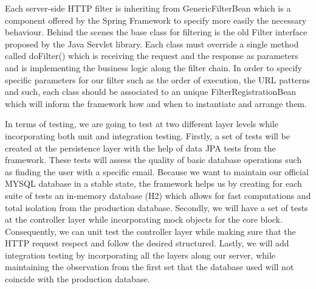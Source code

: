 Each server-side HTTP filter is inheriting from GenericFilterBean which is a component offered by the Spring Framework to specify more easily the necessary behaviour. Behind the scenes the base class for filtering is the old Filter interface proposed by the Java Servlet library. Each class must override a single method called doFilter() which is receiving the request and the response as parameters and is implementing the business logic along the filter chain. In order to specify specific parameters for our filter such as the order of execution, the URL patterns and such, each class should be associated to an unique FilterRegistrationBean which will inform the framework how and when to instantiate and arrange them.

In terms of testing, we are going to test at two different layer levels while incorporating both unit and integration testing. Firstly, a set of tests will be created at the persistence layer with the help of data JPA tests from the framework. These tests will assess the quality of basic database operations such as finding the user with a specific email. Because we want to maintain our official MYSQL database in a stable state, the framework helps us by creating for each suite of tests an in-memory database (H2) which allows for fast computations and total isolation from the production database. Secondly, we will have a set of tests at the controller layer while incorporating mock objects for the core block. Consequently, we can unit test the controller layer while making sure that the HTTP request respect and follow the desired structured. Lastly, we will add integration testing by incorporating all the layers along our server, while maintaining the observation from the first set that the database used will not coincide with the production database.
